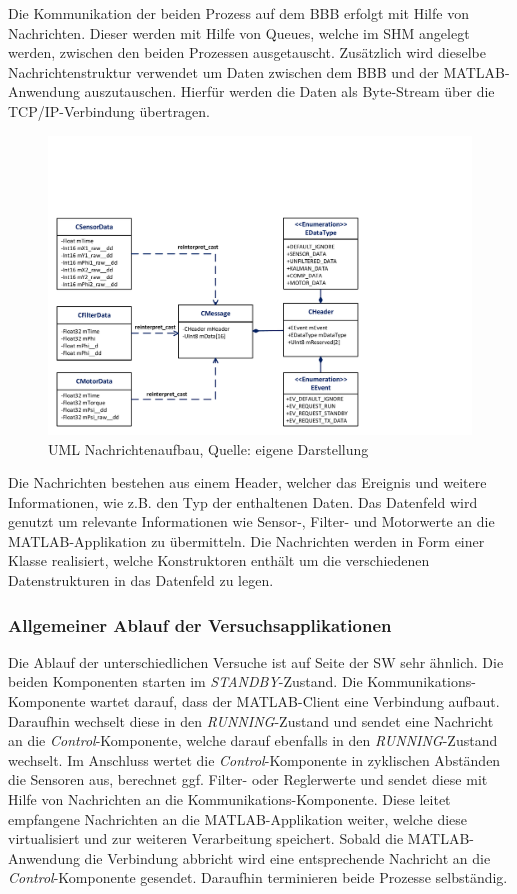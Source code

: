 Die Kommunikation der beiden Prozess auf dem \ac{BBB} erfolgt mit Hilfe von Nachrichten. Dieser werden mit Hilfe von Queues, welche im \ac{SHM} angelegt werden, zwischen den beiden Prozessen ausgetauscht. Zusätzlich wird dieselbe Nachrichtenstruktur verwendet um Daten zwischen dem \ac{BBB} und der MATLAB-Anwendung auszutauschen. Hierfür werden die Daten als Byte-Stream über die TCP/IP-Verbindung übertragen. 

\begin{figure}[!h]
\centering
\includegraphics[width=0.8\linewidth, trim={0cm 0cm 7cm 5cm},clip]{img/UML_MessageClassDiag}
\caption{UML Nachrichtenaufbau, Quelle: eigene Darstellung}
\end{figure}

Die Nachrichten bestehen aus einem Header, welcher das Ereignis und weitere Informationen, wie z.B. den Typ der enthaltenen Daten. Das Datenfeld wird genutzt um relevante Informationen wie Sensor-, Filter- und Motorwerte an die MATLAB-Applikation zu übermitteln. Die Nachrichten werden in Form einer Klasse realisiert, welche Konstruktoren enthält um die verschiedenen Datenstrukturen in das Datenfeld zu legen.

\subsubsection{Allgemeiner Ablauf der Versuchsapplikationen}
Die Ablauf der unterschiedlichen Versuche ist auf Seite der SW sehr ähnlich. Die beiden Komponenten starten im \textit{STANDBY}-Zustand. Die Kommunikations-Komponente wartet darauf, dass der MATLAB-Client eine Verbindung aufbaut. Daraufhin wechselt diese in den \textit{RUNNING}-Zustand und sendet eine Nachricht an die \textit{Control}-Komponente, welche darauf ebenfalls in den \textit{RUNNING}-Zustand wechselt.
Im Anschluss wertet die \textit{Control}-Komponente in zyklischen Abständen die Sensoren aus, berechnet ggf. Filter- oder Reglerwerte und sendet diese mit Hilfe von Nachrichten an die Kommunikations-Komponente. Diese leitet empfangene Nachrichten an die MATLAB-Applikation weiter, welche diese virtualisiert und zur weiteren Verarbeitung speichert. 
Sobald die MATLAB-Anwendung die Verbindung abbricht wird eine entsprechende Nachricht an die \textit{Control}-Komponente gesendet. Daraufhin terminieren beide Prozesse selbständig.
